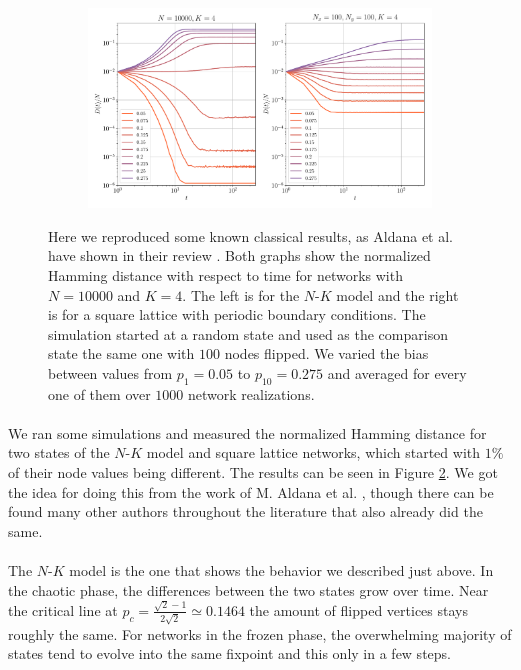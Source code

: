 \paragraph*{}
\begin{figure}
	\begin{subfigure}{\textwidth}
		\includegraphics[width=\textwidth]{Plots/phase_behavior}
		\label{fig:sfig1.1}
	\end{subfigure}
	\caption{Here we reproduced some known classical results, as Aldana et al. have shown in their review \cite{aldana2003boolean2}. Both graphs show the normalized Hamming distance with respect to time for networks with $ N=10000 $ and $ K=4 $. The left is for the $ N $-$ K $ model and the right is for a square lattice with periodic boundary conditions. The simulation started at a random state and used as the comparison state the same one with $ 100 $ nodes flipped. We varied the bias between values from $ p_1 = 0.05 $ to $ p_10 = 0.275 $ and averaged for every one of them over $ 1000 $ network realizations.}
	\label{fig:phase_behavior}
\end{figure}

\paragraph*{}
We ran some simulations and measured the normalized Hamming distance for two states of the $N$-$K$ model and square lattice networks, which started with $1\%$ of their node values being different. The results can be seen in Figure \ref{fig:phase_behavior}. We got the idea for doing this from the work of M. Aldana et al. \cite{aldana2003boolean2}, though there can be found many other authors throughout the literature that also already did the same.

\paragraph*{}
The $N$-$K$ model is the one that shows the behavior we described just above. In the chaotic phase, the differences between the two states grow over time. Near the critical line at $ p_c = \tfrac{\sqrt{2}-1}{2\sqrt{2}} \simeq 0.1464 $ the amount of flipped vertices stays roughly the same. For networks in the frozen phase, the overwhelming majority of states tend to evolve into the same fixpoint and this only in a few steps.

